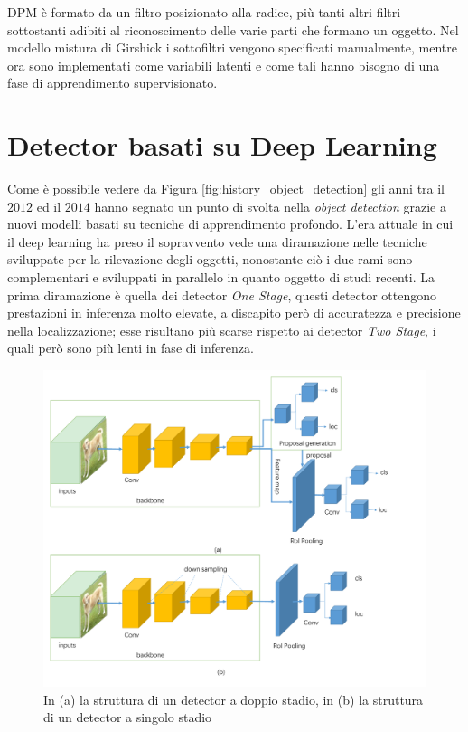 \ac{DPM} è formato da un filtro posizionato alla radice, più tanti altri filtri sottostanti adibiti al riconoscimento delle varie parti che formano un oggetto. Nel modello mistura di Girshick i sottofiltri vengono specificati manualmente, mentre ora sono implementati come variabili latenti e come tali hanno bisogno di una fase di apprendimento supervisionato. 
\section{Detector basati su Deep Learning}
\label{sec:deep_learning_obj}
Come è possibile vedere da Figura \ref{fig:history_object_detection} gli anni tra il $2012$ ed il $2014$ hanno segnato un punto di svolta nella \textit{object detection} grazie a nuovi modelli basati su tecniche di apprendimento profondo. L'era attuale in cui il deep learning ha preso il sopravvento vede una diramazione nelle tecniche sviluppate per la rilevazione degli oggetti, nonostante ciò i due rami sono complementari e sviluppati in parallelo in quanto oggetto di studi recenti. La prima diramazione è quella dei detector \textit{One Stage}, questi detector ottengono prestazioni in inferenza molto elevate, a discapito però di accuratezza e precisione nella localizzazione; esse risultano più scarse rispetto ai detector \textit{Two Stage}, i quali però sono più lenti in fase di inferenza. 
\begin{figure}[]
    \centering
    \includegraphics[width=\textwidth]{images/architectures_one_two_stage.pdf}
    \caption{In (a) la struttura di un detector a doppio stadio, in (b) la struttura di un detector a singolo stadio \cite{DBLP:journals/corr/abs-1907-09408}}
    \label{fig:detector_structure}
\end{figure}

